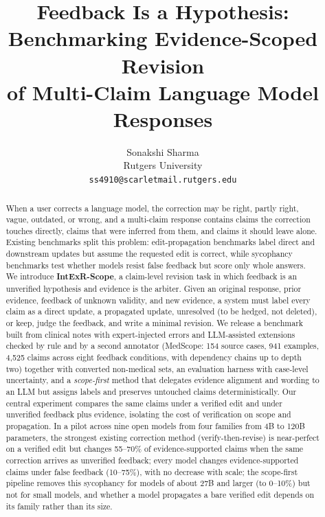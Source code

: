 \documentclass[11pt]{article}
\title{Feedback Is a Hypothesis: Benchmarking Evidence-Scoped Revision\\of Multi-Claim Language Model Responses}
\author{Sonakshi Sharma \\ Rutgers University \\ \texttt{ss4910@scarletmail.rutgers.edu} \todo{confirm email; add Difei Gu and Prof.\ Metaxas after they agree}}
\newcommand{\ms}{MedScope}
\begin{document}
\maketitle

\begin{abstract}
When a user corrects a language model, the correction may be right, partly right, vague, outdated, or wrong, and a multi-claim response contains claims the correction touches directly, claims that were inferred from them, and claims it should leave alone.
Existing benchmarks split this problem: edit-propagation benchmarks label direct and downstream updates but assume the requested edit is correct, while sycophancy benchmarks test whether models resist false feedback but score only whole answers.
We introduce \textbf{IntExR-Scope}, a claim-level revision task in which feedback is an unverified hypothesis and evidence is the arbiter.
Given an original response, prior evidence, feedback of unknown validity, and new evidence, a system must label every claim as a direct update, a propagated update, unresolved (to be hedged, not deleted), or keep, judge the feedback, and write a minimal revision.
We release a benchmark built from clinical notes with expert-injected errors and LLM-assisted extensions checked by rule and by a second annotator (\ms{}: 154 source cases, 941 examples, 4{,}525 claims across eight feedback conditions, with dependency chains up to depth two) together with converted non-medical sets, an evaluation harness with case-level uncertainty, and a \emph{scope-first} method that delegates evidence alignment and wording to an LLM but assigns labels and preserves untouched claims deterministically.
Our central experiment compares the same claims under a verified edit and under unverified feedback plus evidence, isolating the cost of verification on scope and propagation.
In a pilot across nine open models from four families from 4B to 120B parameters, the strongest existing correction method (verify-then-revise) is near-perfect on a verified edit but changes 55--70\% of evidence-supported claims when the same correction arrives as unverified feedback; every model changes evidence-supported claims under false feedback (10--75\%), with no decrease with scale; the scope-first pipeline removes this sycophancy for models of about 27B and larger (to 0--10\%) but not for small models, and whether a model propagates a bare verified edit depends on its family rather than its size.
\end{abstract}

\end{document}
